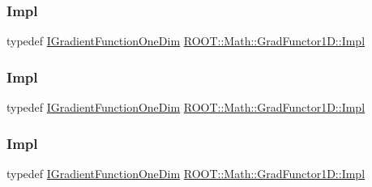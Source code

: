 \subsubsection{\texorpdfstring{Impl}{Impl}\hspace{0.1cm}{\footnotesize\ttfamily [1/3]}}
{\footnotesize\ttfamily typedef \mbox{\hyperlink{classROOT_1_1Math_1_1IGradientFunctionOneDim}{I\+Gradient\+Function\+One\+Dim}} \mbox{\hyperlink{classROOT_1_1Math_1_1GradFunctor1D_a76566ff5310b5900b8df38e0884b3210}{R\+O\+O\+T\+::\+Math\+::\+Grad\+Functor1\+D\+::\+Impl}}}

\mbox{\label{classROOT_1_1Math_1_1GradFunctor1D_a76566ff5310b5900b8df38e0884b3210}} 
\subsubsection{\texorpdfstring{Impl}{Impl}\hspace{0.1cm}{\footnotesize\ttfamily [2/3]}}
{\footnotesize\ttfamily typedef \mbox{\hyperlink{classROOT_1_1Math_1_1IGradientFunctionOneDim}{I\+Gradient\+Function\+One\+Dim}} \mbox{\hyperlink{classROOT_1_1Math_1_1GradFunctor1D_a76566ff5310b5900b8df38e0884b3210}{R\+O\+O\+T\+::\+Math\+::\+Grad\+Functor1\+D\+::\+Impl}}}

\mbox{\label{classROOT_1_1Math_1_1GradFunctor1D_a76566ff5310b5900b8df38e0884b3210}} 
\subsubsection{\texorpdfstring{Impl}{Impl}\hspace{0.1cm}{\footnotesize\ttfamily [3/3]}}
{\footnotesize\ttfamily typedef \mbox{\hyperlink{classROOT_1_1Math_1_1IGradientFunctionOneDim}{I\+Gradient\+Function\+One\+Dim}} \mbox{\hyperlink{classROOT_1_1Math_1_1GradFunctor1D_a76566ff5310b5900b8df38e0884b3210}{R\+O\+O\+T\+::\+Math\+::\+Grad\+Functor1\+D\+::\+Impl}}}

\mbox{\label{classROOT_1_1Math_1_1GradFunctor1D_a16b436a0d100aa6c16ee66961c4f5b97}} 
